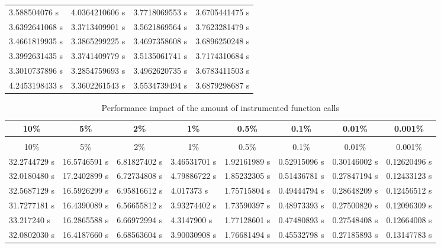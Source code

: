 \begin{table}
\begin{tabular}{llll}
    3.588504076 s  & 4.0364210606 s & 3.7718069553 s & 3.6705441475 s \\
    3.6392641068 s & 3.3713409901 s & 3.5621869564 s & 3.7623281479 s \\
    3.4661819935 s & 3.3865299225 s & 3.4697358608 s & 3.6896250248 s \\
    3.3992631435 s & 3.3741409779 s & 3.5135061741 s & 3.7174310684 s \\
    3.3010737896 s & 3.2854759693 s & 3.4962620735 s & 3.6783411503 s \\
    4.2453198433 s & 3.3602261543 s & 3.5534739494 s & 3.6879298687 s
  \end{tabular}
\end{table}

\begin{landscape}
  \begin{longtable}{llllllll}
    \caption{Performance impact of the amount of instrumented function calls}\\
    \multicolumn{1}{c}{10\%} & \multicolumn{1}{c}{5\%} & \multicolumn{1}{c}{2\%} & \multicolumn{1}{c}{1\%} & \multicolumn{1}{c}{0.5\%} & \multicolumn{1}{c}{0.1\%} & \multicolumn{1}{c}{0.01\%} & \multicolumn{1}{c}{0.001\%} \\\hline
    \endfirsthead
    \caption[]{Performance impact of the amount of instrumented function calls}\\
    \multicolumn{1}{c}{10\%} & \multicolumn{1}{c}{5\%} & \multicolumn{1}{c}{2\%} & \multicolumn{1}{c}{1\%} & \multicolumn{1}{c}{0.5\%} & \multicolumn{1}{c}{0.1\%} & \multicolumn{1}{c}{0.01\%} & \multicolumn{1}{c}{0.001\%} \\\hline
    \endhead
    32.2744729 s& 16.5746591 s& 6.81827402 s& 3.46531701 s& 1.92161989 s& 0.52915096 s& 0.30146002 s& 0.12620496 s\\
    32.0180480 s& 17.2402899 s& 6.72734808 s& 4.79886722 s& 1.85232305 s& 0.51436781 s& 0.27847194 s& 0.12433123 s\\
    32.5687129 s& 16.5926299 s& 6.95816612 s& 4.017373 s  & 1.75715804 s& 0.49444794 s& 0.28648209 s& 0.12456512 s\\
    31.7277181 s& 16.4390089 s& 6.56655812 s& 3.93274402 s& 1.73590397 s& 0.48973393 s& 0.27500820 s& 0.12096309 s\\
    33.217240 s & 16.2865588 s& 6.66972994 s& 4.3147900 s & 1.77128601 s& 0.47480893 s& 0.27548408 s& 0.12664008 s\\
    32.0802030 s& 16.4187660 s& 6.68563604 s& 3.90030908 s& 1.76681494 s& 0.45532798 s& 0.27185893 s& 0.13147783 s\\

\end{longtable}
\end{landscape}

